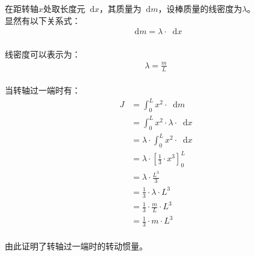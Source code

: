 \documentclass[UTF8]{ctexart}
\newcommand*{\dif}{\mathop{}\!\mathrm{d}}
\begin{document}
    在距转轴$x$处取长度元$\dif x$，其质量为$\dif m$，设棒质量的线密度为$\lambda$。\\[3mm]
    显然有以下关系式：
    \setcounter{equation}{0}
    \begin{align}
        \dif m=\lambda\cdot\dif x
    \end{align}\\
    线密度可以表示为：
    \begin{align}
        \lambda=\frac{m}{L}
    \end{align}\\
    当转轴过一端时有：
    \begin{align}
        J
        &=\int_{0}^{L}x^2\cdot\dif m\\[3mm]
        &=\int_{0}^{L}x^2\cdot\lambda\cdot\dif x\\[3mm]
        &=\lambda\cdot\int_{0}^{L}x^2\cdot\dif x\\[3mm]
        &=\lambda\cdot\left[\frac{1}{3}\cdot x^3\right]_{0}^{L}\\[3mm]
        &=\lambda\cdot\frac{L^3}{3}\\[3mm]
        &=\frac{1}{3}\cdot\lambda\cdot L^3\\[3mm]
        &=\frac{1}{3}\cdot\frac{m}{L}\cdot L^3\\[3mm]
        &=\frac{1}{3}\cdot m\cdot L^3
    \end{align}\\
    由此证明了转轴过一端时的转动惯量。

\newpage
\end{document}
